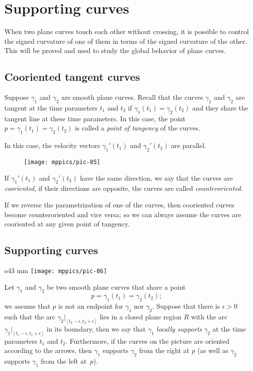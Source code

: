 \chapter{Supporting curves}
\label{chap:supporting-curves}

When two plane curves touch each other without crossing, it is possible to control the signed curvature of one of them in terms of the signed curvature of the other.
This will be proved and used to study the global behavior of plane curves.

\section{Cooriented tangent curves}

Suppose $\gamma_1$ and $\gamma_2$ are smooth plane curves.
Recall that the curves $\gamma_1$ and $\gamma_2$ are tangent at the  time parameters $t_1$ and $t_2$
if $\gamma_1(t_1)=\gamma_2(t_2)$
and they share the tangent line at these time parameters.
In this case, the point $p=\gamma_1(t_1)=\gamma_2(t_2)$ is called a \emph{point of tangency} of the curves.

In this case, the velocity vectors $\gamma_1'(t_1)$ and $\gamma_2'(t_2)$ are parallel.
\begin{figure}[!ht]
\vskip-0mm
\centering
\texttt{[image: mppics/pic-85]}
\vskip-0mm
\end{figure}
If $\gamma_1'(t_1)$ and $\gamma_2'(t_2)$ have the same direction, we say that the curves are \emph{cooriented},
if their directions are opposite, the curves are called {}\emph{counteroriented}.

If we reverse the parametrization of one of the curves, then cooriented curves become counteroriented and vice versa; so we can always assume the curves are cooriented at any given point of tangency.

\section{Supporting curves}

\begin{wrapfigure}[8]{o}{43 mm}
\vskip-4mm
\centering
\texttt{[image: mppics/pic-86]}
\vskip0mm
\end{wrapfigure}

Let $\gamma_1$ and $\gamma_2$ be two smooth plane curves that share a point 
\[p=\gamma_1(t_1)=\gamma_2(t_2);\] 
we assume that $p$ is not an endpoint for $\gamma_1$ nor $\gamma_2$.
Suppose that there is $\epsilon>0$ such that the arc $\gamma_2|_{[t_2-\epsilon, t_2+\epsilon]}$ lies in a closed plane region $R$ with the arc $\gamma_1|_{[t_1-\epsilon, t_1+\epsilon]}$ in its boundary,
then we say that $\gamma_1$ \emph{locally supports} $\gamma_2$ at the time parameters $t_1$ and $t_2$.
Furthermore, if the curves on the picture are oriented according to the arrows, then $\gamma_1$ supports $\gamma_2$ from the right at $p$ (as well as $\gamma_2$ supports $\gamma_1$ from the left at~$p$).

